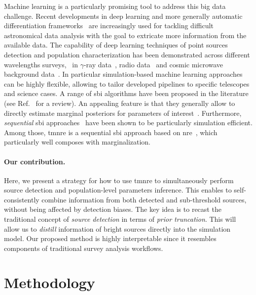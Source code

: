 Machine learning is a particularly promising tool to address this big data challenge. Recent developments in deep learning and more generally automatic differentiation frameworks~\citep{Baydin:2015tfa} are increasingly used for tackling difficult astronomical data analysis with the goal to extricate more information from the available data. The capability of deep learning techniques of point sources detection and population characterization has been demonstrated across different wavelengths surveys, \eg~in $\gamma$-ray data~\citep{Panes:2021zig, Caron:2017udl, List:2021aer, Mishra-Sharma:2021oxe}, radio data~\citep{VafaeiSadr:2018tac, Rezaei:2021aa, Lukic:2019aa, Tilley:2020aa} and cosmic microwave background data~\citep{Bonavera:2021aa}.
In particular simulation-based machine learning approaches can be highly flexible, allowing to tailor developed pipelines to specific telescopes and science cases. 
A range of \gls*{sbi} algorithms have been proposed in the literature (see Ref.~\cite{Cranmer:2019eaq} for a review). An appealing feature is that they generally allow to directly estimate marginal posteriors for parameters of interest~\citep{Miller:2020hua}. Furthermore, \textit{sequential} \gls*{sbi} approaches~\citep{Durkan:2018aa, Papamakarios:2016ctj, Papamakarios:2018aa} have been shown to be particularly simulation efficient.  Among those, \gls*{tmnre} \citep{Miller:2020hua, Miller:2021aa} is a sequential \gls*{sbi} approach 
based on \gls*{nre}~\citep{Hermans:2019ioj},  which particularly well composes with marginalization.

\paragraph{Our contribution.}  Here, we present a strategy for how to use \gls*{tmnre} to simultaneously perform source detection and population-level parameters inference. This enables to self-consistently combine information from both detected and sub-threshold sources, without being affected by detection biases. The key idea is to recast the traditional concept of \emph{source detection} in terms of \emph{prior truncation}.  This will allow us to \textit{distill} information of bright sources directly into the simulation model. Our proposed method is highly interpretable since it resembles components of traditional survey analysis workflows. 


\section{Methodology}
\label{sec:ps-method}

